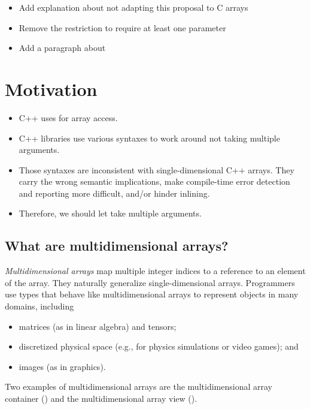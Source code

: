 \documentclass{wg21}
\begin{document}
\begin{itemize}
    \item Add explanation about not adapting this proposal to C arrays
    \item Remove the restriction to require at least one parameter
    \item Add a paragraph about 
\end{itemize}

\section{Motivation}

\begin{itemize}
\item C++ uses  for array access.
\item C++ libraries use various syntaxes to work around  not taking multiple arguments.
\item Those syntaxes are inconsistent with single-dimensional C++ arrays.
  They carry the wrong semantic implications,
  make compile-time error detection and reporting more difficult,
  and/or hinder inlining.
\item Therefore, we should let  take multiple arguments.
\end{itemize}

\subsection{What are multidimensional arrays?}

\emph{Multidimensional arrays} map multiple integer indices to a reference to an element of the array.
They naturally generalize single-dimensional arrays.
Programmers use types that behave like multidimensional arrays to represent objects in many domains, including

\begin{itemize}
\item matrices (as in linear algebra) and tensors;
\item discretized physical space (e.g., for physics simulations or video games); and
\item images (as in graphics).
\end{itemize}

Two examples of multidimensional arrays are the multidimensional array container  ()
and the multidimensional array view  ().
\end{document}
